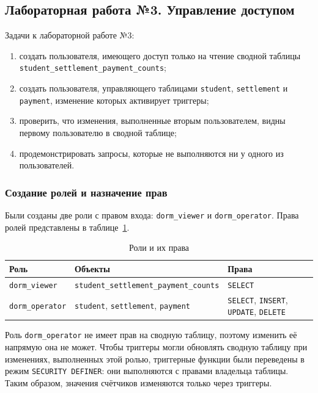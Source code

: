 \newpage
\subsection{Лабораторная работа №3. Управление доступом}

Задачи к лабораторной работе №3:

\begin{enumerate}
\item создать пользователя, имеющего доступ только на чтение сводной таблицы \texttt{student\_settlement\_payment\_counts};
\item создать пользователя, управляющего таблицами \texttt{student}, \texttt{settlement} и \texttt{payment}, изменение которых активирует триггеры;
\item проверить, что изменения, выполненные вторым пользователем, видны первому пользователю в сводной таблице;
\item продемонстрировать запросы, которые не выполняются ни у одного из пользователей.
\end{enumerate}

\subsubsection{Создание ролей и назначение прав}

Были созданы две роли с правом входа: \texttt{dorm\_viewer} и \texttt{dorm\_operator}. Права ролей представлены в таблице~\ref{tab:roles}.

\begin{table}[H]
\centering
\caption{Роли и их права}
\label{tab:roles}
\begin{tabularx}{\textwidth}{|>{\raggedright\arraybackslash}p{3.5cm}|>{\raggedright\arraybackslash}X|>{\raggedright\arraybackslash}p{3.8cm}|}
\hline
\textbf{Роль} & \textbf{Объекты} & \textbf{Права} \\ \hline
\texttt{dorm\_viewer} & \texttt{student\_settlement\_payment\_counts} & \texttt{SELECT} \\ \hline
\texttt{dorm\_operator} & \texttt{student}, \texttt{settlement}, \texttt{payment} & \texttt{SELECT}, \texttt{INSERT}, \texttt{UPDATE}, \texttt{DELETE} \\ \hline
\end{tabularx}
\end{table}


Роль \texttt{dorm\_operator} не имеет прав на сводную таблицу, поэтому изменить её напрямую она не может. Чтобы триггеры могли обновлять сводную таблицу при изменениях, выполненных этой ролью, триггерные функции были переведены в режим \texttt{SECURITY DEFINER}: они выполняются с правами владельца таблицы. Таким образом, значения счётчиков изменяются только через триггеры.

